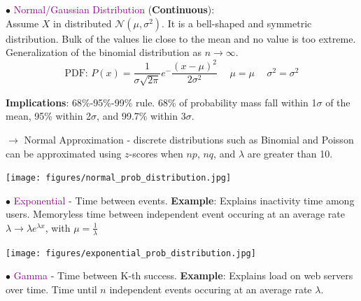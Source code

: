 \documentclass[letterpaper, 10.5pt,landscape]{article}
\begin{document}
\begin{multicols*}{3}
\vspace{3pt}
$\bullet$ \textcolor{purple}{Normal/Gaussian Distribution} (\textbf{Continuous}): \\
Assume $X$ in distributed $\mathcal{N}(\mu, \sigma^{2})$. It is a bell-shaped and symmetric distribution. Bulk of the values lie close to the mean and no value is too extreme. Generalization of the binomial distribution as $n \rightarrow \infty$.
\vspace{-3pt}
\[\boxed{\text{PDF: } P(x) = \frac{1}{\sigma\sqrt{2\pi}} e^-\frac{(x-\mu)^{2}}{2\sigma^{2}}} \hspace{15pt} \boxed{\mu =\mu}  \hspace{15pt}  \boxed{\sigma^{2} =  \sigma^{2}} \]


\textbf{Implications}: 68\%-95\%-99\% rule. 68\% of probability mass fall within 1$\sigma$ of the mean, 95\% within 2$\sigma$, and 99.7\% within 3$\sigma$.


$\rightarrow$ Normal Approximation - discrete distributions such as Binomial and Poisson can be approximated using $z$-scores when $np$, $nq$, and $\lambda$ are greater than 10.
\vspace{-4pt}
\begin{center}
    \begin{minipage}{0.5\linewidth}
    \texttt{[image: figures/normal\_prob\_distribution.jpg]}
    \end{minipage}
\end{center}
\vspace{-4pt}



\vspace{2pt}
$\bullet$ \textcolor{purple}{Exponential} -  Time between events. \textbf{Example}: Explains inactivity time among users. 
Memoryless time  between independent event occuring at an average rate $\boxed{\lambda \rightarrow \lambda e^{\lambda x}}$, with $\boxed{\mu = \frac{1}{\lambda}}$
\vspace{-4pt}
\begin{center}
    \begin{minipage}{0.5\linewidth}
    \texttt{[image: figures/exponential\_prob\_distribution.jpg]}
    \end{minipage}
\end{center}
\vspace{-4pt}




\vspace{2pt}

$\bullet$ \textcolor{purple}{Gamma} -  Time between K-th success. \textbf{Example}: Explains load on web servers over time. Time until $n$ independent events occuring at an average rate $\lambda$.




\end{multicols*}
\end{document}
